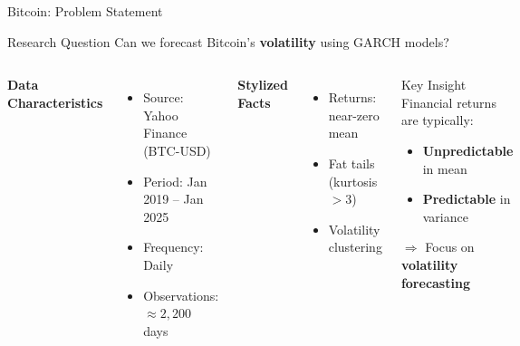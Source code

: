 \documentclass[9pt, aspectratio=169, t]{beamer}
\begin{document}
\begin{frame}{Bitcoin: Problem Statement}
    \begin{block}{Research Question}
        Can we forecast Bitcoin's \textbf{volatility} using GARCH models?
    \end{block}

    \vspace{0.2cm}

    \begin{columns}[T]
        \textbf{Data Characteristics}
        \begin{itemize}\setlength{\itemsep}{0pt}
            \item Source: Yahoo Finance (BTC-USD)
            \item Period: Jan 2019 -- Jan 2025
            \item Frequency: Daily
            \item Observations: $\approx 2,200$ days
        \end{itemize}

        \vspace{0.3cm}

        \textbf{Stylized Facts}
        \begin{itemize}\setlength{\itemsep}{0pt}
            \item Returns: near-zero mean
            \item Fat tails (kurtosis $> 3$)
            \item Volatility clustering
        \end{itemize}

        \begin{alertblock}{Key Insight}
            Financial returns are typically:
            \begin{itemize}\setlength{\itemsep}{0pt}
                \item \textbf{Unpredictable} in mean
                \item \textbf{Predictable} in variance
            \end{itemize}

            \vspace{0.2cm}
            $\Rightarrow$ Focus on \textbf{volatility forecasting}
        \end{alertblock}
    \end{columns}
\end{frame}
\end{document}

